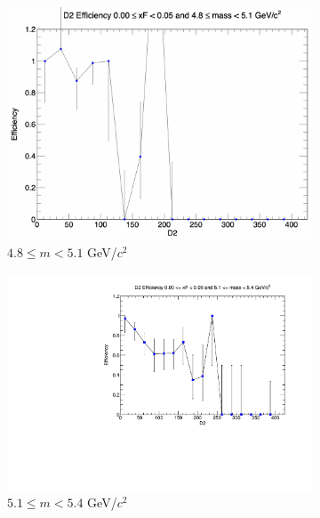 \documentclass[11pt]{article}
\begin{document}
\begin{figure}[p]
\begin{subfigure}[b]{0.32\textwidth}
        \includegraphics[width=\textwidth]{./kTrackerEfficiencyPlots/D2_Efficiency_xF0_mass2.png}
        \caption{$4.8 \leq m < 5.1$ GeV/$c^2$}
    \end{subfigure}\vspace{0.5cm}
    \begin{subfigure}[b]{0.32\textwidth}
        \centering
        \includegraphics[width=\textwidth]{./kTrackerEfficiencyPlots/D2_Efficiency_xF0_mass3.pdf}
        \caption{$5.1 \leq m < 5.4$ GeV/$c^2$}
    \end{subfigure}\hfill
    \begin{subfigure}[b]{0.32\textwidth}
        \centering

\end{subfigure}
\end{figure}
\end{document}
